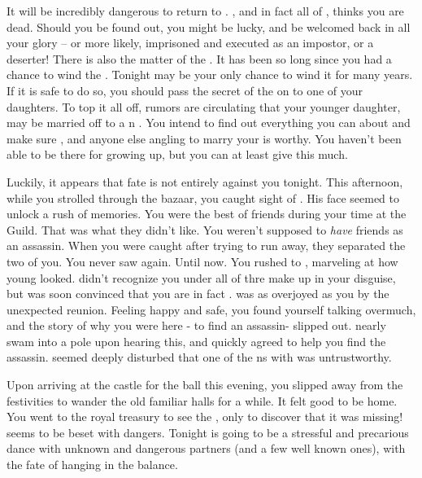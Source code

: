 \documentclass[char]{NeptuneBall}
\begin{document}
It will be incredibly dangerous to return to \pAtlantis{}. \cKing{}, and in fact all of \pAtlantis{}, thinks you are dead. Should you be found out, you might be lucky, and be welcomed back in all your glory -- or more likely, imprisoned and executed as an impostor, or a deserter! There is also the matter of the \iMusicBox{\MYname}. It has been so long since you had a chance to wind the \iMusicBox{\MYname}. Tonight may be your only chance to wind it for many years. If it is safe to do so, you should pass the secret of the \iMusicBox{\MYname} on to one of your daughters. To top it all off, rumors are circulating that your younger daughter, \cPrincess{} may be married off to a \pPacifica{}n \cPrince{\prince}. You intend to find out everything you can about \cPrince{\them} and make sure \cPrince{\they}, and anyone else angling to marry your \cPrincess{\offspring} is worthy. You haven't been able to be there for \cPrincess{} growing up, but you can at least give \cPrincess{\them} this much.

Luckily, it appears that fate is not entirely against you tonight. This afternoon, while you strolled through the bazaar, you caught sight of \cDiplomat{}. His face seemed to unlock a rush of memories. You were the best of friends during your time at the Guild.  That was what they didn't like. You weren't supposed to \emph{have} friends as an assassin.  When you were caught after trying to run away, they separated the two of you. You never saw \cDiplomat{\them} again. Until now. You rushed to \cDiplomat{\them}, marveling at how young \cDiplomat{\they} looked. \cDiplomat{} didn't recognize you under all of thre make up in your disguise, but was soon convinced that you are in fact \cQueen{}. \cDiplomat{\They} was as overjoyed as you by the unexpected reunion. Feeling happy and safe, you found yourself talking overmuch, and the story of why you were here - to find an assassin- slipped out. \cDiplomat{} nearly swam into a pole upon hearing this, and quickly agreed to help you find the assassin. \cDiplomat{\They} seemed deeply disturbed that one of the \pPacifica{}ns with \cDiplomat{\them} was untrustworthy.

Upon arriving at the castle for the ball this evening, you slipped away from the festivities to wander the old familiar halls for a while. It felt good to be home. You went to the royal treasury to see the \iMusicBox{\MYname}, only to discover that it was missing! \pAtlantis{} seems to be beset with dangers. Tonight is going to be a stressful and precarious dance with unknown and dangerous partners (and a few well known ones), with the fate of \pAtlantis{} hanging in the balance.
\end{document}
